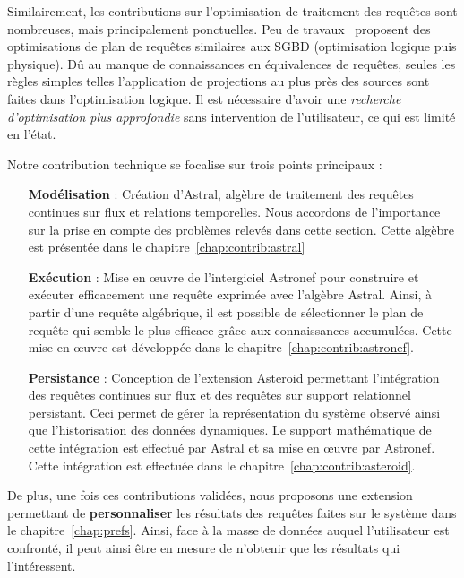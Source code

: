 Similairement, les contributions sur l'optimisation de traitement des requêtes sont nombreuses, mais principalement ponctuelles. Peu de travaux~\cite{Galpin:snee,Kramer:semantics} proposent des optimisations de plan de requêtes similaires aux SGBD (optimisation logique puis physique). Dû au manque de connaissances en équivalences de requêtes, seules les règles simples telles l'application de projections au plus près des sources sont faites dans l'optimisation logique. Il est nécessaire d'avoir une \textit{recherche d'optimisation plus approfondie} sans intervention de l'utilisateur, ce qui est limité en l'état.

Notre contribution technique se focalise sur trois points principaux :
\begin{itemize}
 \item[\textbf{Modélisation}] : Création d'Astral, algèbre de traitement des requêtes continues sur flux et relations temporelles. Nous accordons de l'importance sur la prise en compte des problèmes relevés dans cette section. Cette algèbre est présentée dans le chapitre~\ref{chap:contrib:astral}
 \item[\textbf{Exécution}] : Mise en œuvre de l'intergiciel Astronef pour construire et exécuter efficacement une requête exprimée avec l'algèbre Astral. Ainsi, à partir d'une requête algébrique, il est possible de sélectionner le plan de requête qui semble le plus efficace grâce aux connaissances accumulées. Cette mise en œuvre est développée dans le chapitre~\ref{chap:contrib:astronef}.
 \item[\textbf{Persistance}] : Conception de l'extension Asteroid permettant l'intégration des requêtes continues sur flux et des requêtes sur support relationnel persistant. Ceci permet de gérer la représentation du système observé ainsi que l'historisation des données dynamiques. Le support mathématique de cette intégration est effectué par Astral et sa mise en œuvre par Astronef. Cette intégration est effectuée dans le chapitre~\ref{chap:contrib:asteroid}.
\end{itemize}

De plus, une fois ces contributions validées, nous proposons une extension permettant de \textbf{personnaliser} les résultats des requêtes faites sur le système dans le chapitre~\ref{chap:prefs}. Ainsi, face à la masse de données auquel l'utilisateur est confronté, il peut ainsi être en mesure de n'obtenir que les résultats qui l'intéressent.

